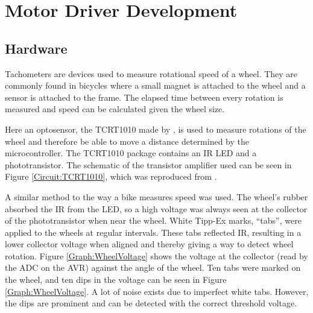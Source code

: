 \section{Motor Driver Development}\label{Section:Motor_Dev}

\subsection{Hardware}
Tachometers are devices used to measure rotational speed of a wheel. They are commonly found in bicycles where a small magnet is attached to the wheel and a sensor is attached to the frame. The elapsed time between every rotation is measured and speed can be calculated given the wheel size. 

Here an optosensor, the TCRT1010 made by \cite{Vishay:TCRT1010:Datasheet}, is used to measure rotations of the wheel and therefore be able to move a distance determined by the microcontroller. The TCRT1010 package contains an IR LED and a phototransistor. The schematic of the transistor amplifier used can be seen in Figure \ref{Circuit:TCRT1010}, which was reproduced from \cite{c9Lab:SRG}. 

A similar method to the way a bike measures speed was used. The wheel's rubber absorbed the IR from the LED, so a high voltage was always seen at the collector of the phototransistor when near the wheel. White Tipp-Ex marks, ``tabs'', were applied to the wheels at regular intervals. These tabs reflected IR, resulting in a lower collector voltage when aligned and thereby giving a way to detect wheel rotation. Figure \ref{Graph:WheelVoltage} shows the voltage at the collector (read by the ADC on the AVR) against the angle of the wheel. Ten tabs were marked on the wheel, and ten dips in the voltage can be seen in Figure \ref{Graph:WheelVoltage}. A lot of noise exists due to imperfect white tabs. However, the dips are prominent and can be detected with the correct threshold voltage.

